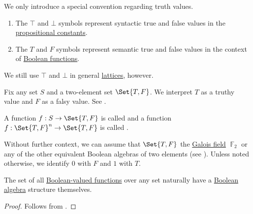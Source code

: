 \begin{remark}
  We only introduce a special convention regarding truth values.
  \begin{enumerate}
    \item The \( \top \) and \( \bot \) symbols represent syntactic true and false values in the \hyperref[def:propositional_language/constants]{propositional constants}.
    \item The \( T \) and \( F \) symbols represent semantic true and false values in the context of \hyperref[def:boolean_function]{Boolean functions}.
  \end{enumerate}

  We still use \( \top \) and \( \bot \) in general \hyperref[def:lattice]{lattices}, however.
\end{remark}

\begin{definition}\label{def:boolean_function}
  Fix any set \( S \) and a two-element set \( \Set{ T, F } \). We interpret \( T \) as a truthy value and \( F \) as a falsy value. See .

  A function \( f: S \to \Set{ T, F } \) is called  and a function \( f: \Set{ T, F }^n \to \Set{ T, F } \) is called .

  Without further context, we can assume that \( \Set{ T, F } \) the \hyperref[thm:galois_field_existence]{Galois field} \( \BbbF_2 \) or any of the other equivalent Boolean algebras of two elements (see ). Unless noted otherwise, we identify \( 0 \) with \( F \) and \( 1 \) with \( T \).
\end{definition}

\begin{proposition}\label{thm:boolean_functions_form_boolean_algebra}
  The set of all \hyperref[def:boolean_function]{Boolean-valued functions} over any set naturally have a \hyperref[def:boolean_algebra]{Boolean algebra} structure themselves.
\end{proposition}
\begin{proof}
  Follows from .
\end{proof}

